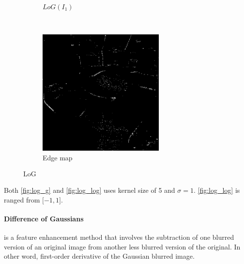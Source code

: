 \documentclass[12pt]{article}
\begin{document}
\begin{figure}[H]
\begin{subfigure}[t]{0.5\textwidth}
        \caption{$LoG(I_1)$}
        \label{fig:log_log}
    \end{subfigure}%
    ~
    \begin{subfigure}[t]{0.5\textwidth}
        \centering
        \includegraphics[height=2.5in]{images/log_edge}
        \caption{Edge map}
    \end{subfigure}
    \caption{LoG}
\end{figure}
Both \autoref{fig:log_g} and \autoref{fig:log_log} uses kernel size of 5 and $\sigma=1$. \autoref{fig:log_log} is ranged from $\lbrack -1, 1 \rbrack$. 

\paragraph*{Difference of Gaussians} is a feature enhancement method that involves the subtraction of one blurred version of an original image from another less blurred version of the original. 
In other word, first-order derivative of the Gaussian blurred image.
\end{document}
